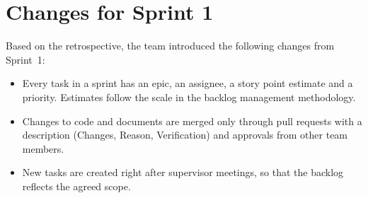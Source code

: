 \documentclass[12pt,a4paper]{article}
\begin{document}

\section{Changes for Sprint 1}

Based on the retrospective, the team introduced the following changes
from Sprint~1:

\begin{itemize}
    \item Every task in a sprint has an epic, an assignee, a story point
          estimate and a priority. Estimates follow the scale in the
          backlog management methodology.
    \item Changes to code and documents are merged only through pull
          requests with a description (Changes, Reason, Verification) and
          approvals from other team members.
    \item New tasks are created right after supervisor meetings, so that
          the backlog reflects the agreed scope.
\end{itemize}
\end{document}
